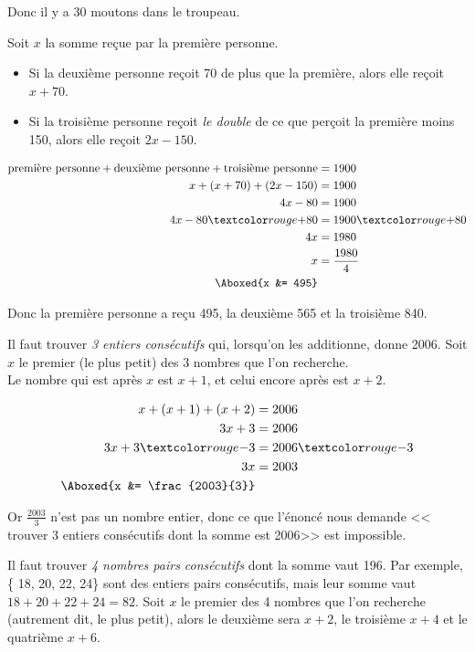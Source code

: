 \documentclass["../Cours.tex"]{subfiles}
\begin{document}
\begin{questions}
    Donc il y a 30 moutons dans le troupeau.

    \exercice Soit $x$ la somme reçue par la première personne.
    \begin{itemize}
        \item Si la deuxième personne reçoit \qty{70}{\EURO} de plus que la première, alors elle reçoit $x+70$.
        \item Si la troisième personne reçoit \emph{le double} de ce que perçoit la première moins \qty{150}{\EURO}, alors elle reçoit $2x-150$.
    \end{itemize}

    \vspace{-1.5em}
    \begin{align*}
        \mbox{première personne} + \mbox{deuxième personne} + \mbox{troisième personne} &= 1900\\ 
        x + (x+70) + (2x-150) &= 1900 \\
        4x -80 &= 1900\\
        4x-80 \red{+80} &= 1900 \red{+80} \\
        4x &= 1980\\
        x &= \frac{1980}{4} \\ 
        \Aboxed{x &= 495}
    \end{align*}

    Donc la première personne a reçu \qty{495}{\EURO}, la deuxième \qty{565}{\EURO} et la troisième \qty{840}{\EURO}.

    \exercice Il faut trouver \emph{3 entiers consécutifs} qui, lorsqu'on les additionne, donne 2006. Soit $x$ le premier (le plus petit) des 3 nombres que l'on recherche.\\ 
    Le nombre qui est après $x$ est $x+1$, et celui encore après est $x+2$.

    \begin{align*}
        x + (x+1) + (x+2) &= 2006 \\
        3x + 3 &= 2006 \\
        3x + 3 \red{-3} &= 2006 \red{-3} \\
        3x &= 2003 \\
        \Aboxed{x &= \frac{2003}{3}}
    \end{align*}

    Or $\frac{2003}{3}$ n'est pas un nombre entier, donc ce que l'énoncé nous demande << trouver 3 entiers consécutifs dont la somme est 2006>> est impossible.

    \exercice Il faut trouver \emph{4 nombres pairs consécutifs} dont la somme vaut 196. Par exemple, \{ 18, 20, 22, 24\} sont des entiers pairs consécutifs, mais leur somme vaut $18+20+22+24=82$. Soit $x$ le premier des 4 nombres que l'on recherche (autrement dit, le plus petit), alors le deuxième sera $x+2$, le troisième $x+4$ et le quatrième $x+6$.


\end{questions}
\end{document}
